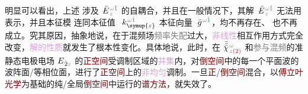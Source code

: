 明显可以看出，上述  涉及 $\xint{\mathcolor{gray}{-}}{255}{\bar{E}}^{\;\! \mathcolor{gray}{\omega} \textcolor{PineGreen}{\hat{1}}}_{\;\! \mathcolor{gray}{z}}$ 的\textcolor{NavyBlue}{自耦合}，并且在一般情况下，其解 $\xint{\mathcolor{gray}{-}}{255}{\bar{E}}^{\;\! \mathcolor{gray}{\omega} \textcolor{PineGreen}{\hat{1}}}_{\;\! \mathcolor{gray}{z}}$ 无法用  表示，并且\textcolor{PineGreen}{本征模}  连同\textcolor{PineGreen}{本征值} $\xint{\begin{smallmatrix} ~ \\ {}^{}_{\mathcolor{gray}{-}} \\ ~ \end{smallmatrix}}{15}{k}_{\symup{z}}^{\;\! \mathcolor{gray}{\omega} \textcolor{PineGreen}{\hat{1}}}$ \textcolor{PineGreen}{本征向量} $\xint{{}^{}_{\mathcolor{gray}{-}}}{10}{\bar{g}}^{\;\!\mathcolor{gray}{\omega} \textcolor{PineGreen}{\hat{1}}}$，均不再存在、 也不再成立。究其原因，抽象地说，在于\textcolor{NavyBlue}{混频场}\textcolor{gray}{频率失配}过大，\textcolor{Plum}{非线性}相互作用方式完全改变，\textcolor{Plum}{解的性质}就发生了根本性变化。具体地说，此时，在 $\bar{\bar{\bar{\chi}}}^{\;\! \mathcolor{gray}{\omega} }_{\;\! \mathcolor{gray}{z} \textcolor{Maroon}{(2)}}$ 和\textcolor{gray}{参与混频}的\textcolor{NavyBlue}{准静态}电极电场 ${E}_{\;\! \hat{2} \mathcolor{gray}{z}}$ 的\textcolor{Maroon}{正空间}\textcolor{NavyBlue}{受调制区域}的\textcolor{Plum}{并集}内，对\textcolor{Maroon}{倒空间}中的每一个\textcolor{PineGreen}{平面波}的\textcolor{PineGreen}{波阵面}/\textcolor{PineGreen}{等相位面}，进行了\textcolor{Maroon}{正空间}上的\textcolor{Plum}{非均匀}\textcolor{NavyBlue}{调制}。一旦\textcolor{Maroon}{正}/\textcolor{Maroon}{倒空间}混合，以\textcolor{Maroon}{傅立叶光学}为基础的纯/全局\textcolor{Maroon}{倒空间}中运行的\textcolor{Maroon}{谱方法}，就失效了。

